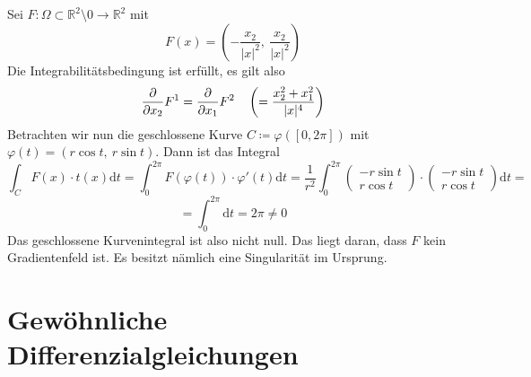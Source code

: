 \begin{beispiel}
Sei $F:\Omega\subset\mathbb{R}^2\setminus{0}\rightarrow\mathbb{R}^2$ mit
\begin{equation*}
	F(x)=\left(	-\frac{x_2}{|x|^2},\ \frac{x_2}{|x|^2 }\right)
\end{equation*}
Die Integrabilitätsbedingung ist erfüllt, es gilt also
\begin{equation*}
	\pdiff{}{x_2}F^1=\pdiff{}{x_1}F^2 \ \ \ 
	\left(=\frac{x_2^2+x_1^2}{|x|^4}\right)
\end{equation*}
Betrachten wir nun die geschlossene Kurve $C\coloneqq 
\varphi([0,2\pi])$ mit $\varphi(t)=(r\cos t,\ r\sin t)$. 
Dann ist das Integral
\begin{equation*}
	\int_C F(x)\cdot t(x)\mathrm{d}t = 
	\int_0^{2\pi}F(\varphi(t))\cdot\varphi'(t)\mathrm{d}t = 
	\frac{1}{r^2}\int_0^{2\pi}\begin{pmatrix}
	-r\sin t \\ r\cos t	\end{pmatrix} \cdot 
	\begin{pmatrix}
	-r\sin t \\ r\cos t	\end{pmatrix}\mathrm{d}t = 
\end{equation*}
\begin{equation*}
	= \int_0^{2\pi}\mathrm{d}t = 2\pi \neq 0
\end{equation*}
Das geschlossene Kurvenintegral ist also nicht null. Das liegt 
daran, dass $F$ kein Gradientenfeld ist. Es besitzt nämlich 
eine Singularität im Ursprung.
\end{beispiel}

\chapter{Gewöhnliche Differenzialgleichungen}
\setcounter{section}{33}
